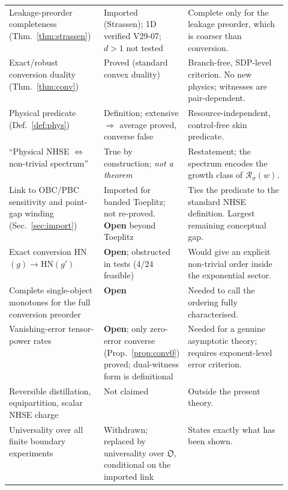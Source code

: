 \documentclass[11pt]{article}
\theoremstyle{definition}
\theoremstyle{remark}
\begin{document}
\begin{tcolorbox}[breakable,enhanced,colback=gray!4,colframe=black!70,
  title={\textbf{Status of the universal construction}},fonttitle=\large,boxrule=0.8pt,arc=2pt,left=4pt,right=4pt]
\begin{tabularx}{\linewidth}{@{}>{\raggedright\arraybackslash}p{0.34\linewidth}>{\raggedright\arraybackslash}p{0.20\linewidth}>{\raggedright\arraybackslash}X@{}}
Leakage-preorder completeness (Thm.~\ref{thm:strassen}) & Imported (Strassen); 1D verified V29-07; $d>1$ not tested & Complete only for the leakage preorder, which is coarser than conversion.\\
Exact/robust conversion duality (Thm.~\ref{thm:conv}) & Proved (standard convex duality) & Branch-free, SDP-level criterion. No new physics; witnesses are pair-dependent.\\
Physical predicate (Def.~\ref{def:phys}) & Definition; extensive $\Rightarrow$ average proved, converse false & Resource-independent, control-free skin predicate.\\
``Physical NHSE $\Leftrightarrow$ non-trivial spectrum'' & True by construction; \emph{not a theorem} & Restatement; the spectrum encodes the growth class of $\mathcal R_\sigma(w)$.\\
Link to OBC/PBC sensitivity and point-gap winding (Sec.~\ref{sec:import}) & Imported for banded Toeplitz; not re-proved. \textbf{Open} beyond Toeplitz & Ties the predicate to the standard NHSE definition. Largest remaining conceptual gap.\\
Exact conversion HN$(g)\to$HN$(g')$ & \textbf{Open}; obstructed in tests (4/24 feasible) & Would give an explicit non-trivial order inside the exponential sector.\\
Complete single-object monotones for the full conversion preorder & \textbf{Open} & Needed to call the ordering fully characterised.\\
Vanishing-error tensor-power rates & \textbf{Open}; only zero-error converse (Prop.~\ref{prop:conv0}) proved; dual-witness form is definitional & Needed for a genuine asymptotic theory; requires exponent-level error criterion.\\
Reversible distillation, equipartition, scalar NHSE charge & Not claimed & Outside the present theory.\\
Universality over all finite boundary experiments & Withdrawn; replaced by universality over $\mathfrak O$, conditional on the imported link & States exactly what has been shown.\\
\bottomrule
\end{tabularx}
\end{tcolorbox}
\end{document}

